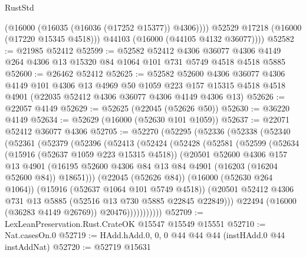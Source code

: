 \begin{lexlean}{RustStd}
\begin{coremodule}
              (@16000 (@16035 (@16036 (@17252 @15377)) @4306))))
          @52529
          @17218
          (@16000 (@17220 @15345 @4518)))
        @44103
        (@16000 (@44105 @4132 @36077))))
@52582 := @21985 @52412
@52599 := @52582
    @52412
    @4306
    @36077
    @4306
    @4149
    @264
    @4306
    @13
    @15320
    @84
    @1064
    @101
    @731
    @5749
    @4518
    @4518
    @5885
@52600 := @26462 @52412
@52625 := @52582
    @52600
    @4306
    @36077
    @4306
    @4149
    @101
    @4306
    @13
    @4969
    @50
    @1059
    @223
    @157
    @15315
    @4518
    @4518
    @4901
    (@22035 @52412 @4306 @36077 @4306 @4149 @4306 @13)
@52626 := @22057 @4149
@52629 := @52625 (@22045 (@52626 @50))
@52630 := @36220 @4149
@52634 := @52629 (@16000 (@52630 @101 @1059))
@52637 := @22071 @52412 @36077 @4306
@52705 := @52270
    (@52295
      (@52336
        (@52338
          (@52340
            (@52361
              (@52379
                (@52396
                  (@52413
                    (@52424
                      (@52428
                        (@52581
                          (@52599
                            (@52634
                              (@15916 (@52637 @1059 @223 @15315 @4518))
                              (@20501
                                @52600
                                @4306
                                @157
                                @13
                                @4901
                                (@16195
                                  @52600
                                  @4306
                                  @84
                                  @13
                                  @84
                                  @4901
                                  (@16203 (@16204 @52600 @84))
                                  @18651)))
                            (@22045 (@52626 @84))
                            (@16000 (@52630 @264 @1064))
                            (@15916 (@52637 @1064 @101 @5749 @4518))
                            (@20501
                              @52412
                              @4306
                              @731
                              @13
                              @5885
                              (@52516 @13 @730 @5885 @22845 @22849)))
                          @22494
                          (@16000 (@36283 @4149 @26769))
                          @20476)))))))))))
@52709 := LexLeanPreservation.Rust.CrateOK @15547 @15549 @15551
@52710 := Nat.casesOn.{0}
@52719 := HAdd.hAdd.{0, 0, 0} @44 @44 @44 (instHAdd.{0} @44 instAddNat)
@52720 := @52719 @15631

\end{coremodule}
\end{lexlean}
